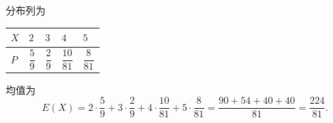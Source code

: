 \begin{answer}
分布列为

\begin{center}
\begin{tabular}{lllll}
\toprule
$X$ & $2$ & $3$ & $4$ & $5$ \\
\midrule
$P$ & $\dfrac59$ & $\dfrac29$ & $\dfrac{10}{81}$ & $\dfrac8{81}$ \\
\bottomrule
\end{tabular}
\end{center}

均值为
\nopagebreak[4]
\[E(X)=2\cdot\frac59+3\cdot\frac29+4\cdot\frac{10}{81}+5\cdot\frac8{81}
=\frac{90+54+40+40}{81}
=\frac{224}{81} .\]



\end{answer}
